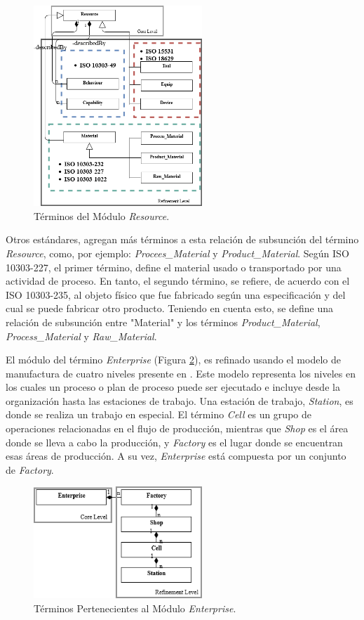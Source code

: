 \documentclass[journal]{IEEEtran}
\begin{document}
\begin{figure}[!t]
\centering
\includegraphics[width=2.5in]{figures/Completo-Resource.png}
\caption{T\'erminos del M\'odulo \emph{Resource}.}
\label{fig6}
\end{figure}

Otros est\'andares, agregan m\'as t\'erminos a esta relaci\'on de subsunci\'on del t\'ermino \emph{Resource}, como, por ejemplo: \emph{Procees\_Material} y \emph{Product\_Material}. Seg\'un ISO 10303-227, el primer t\'ermino, define el material usado o transportado por una actividad de proceso. En tanto, el segundo t\'ermino, se refiere, de acuerdo con el ISO 10303-235, al objeto f\'isico que fue fabricado seg\'un una especificaci\'on y del cual se puede fabricar otro producto. Teniendo en cuenta esto, se define una relaci\'on de subsunci\'on entre "Material" y los t\'erminos \emph{Product\_Material}, \emph{Process\_Material} y \emph{Raw\_Material}.

El m\'odulo del t\'ermino \emph{Enterprise} (Figura \ref{fig7}), es refinado usando el modelo de manufactura de cuatro niveles presente en \cite{Zhao1999}. Este modelo representa los niveles en los cuales un proceso o plan de proceso puede ser ejecutado e incluye desde la organizaci\'on hasta las estaciones de trabajo. Una estaci\'on de trabajo, \emph{Station}, es donde se realiza un trabajo en especial. El t\'ermino \emph{Cell} es un grupo de operaciones relacionadas en el flujo de producci\'on, mientras que \emph{Shop} es el \'area donde se lleva a cabo la producci\'on, y \emph{Factory} es el lugar donde se encuentran esas \'areas de producci\'on. A su vez, \emph{Enterprise} est\'a compuesta por un conjunto de \emph{Factory}.

\begin{figure}[!t]
\centering
\includegraphics[width=2.5in]{figures/Completo-Enterprise.png}
\caption{T\'erminos Pertenecientes al M\'odulo \emph{Enterprise}.}
\label{fig7}
\end{figure}
\end{document}
